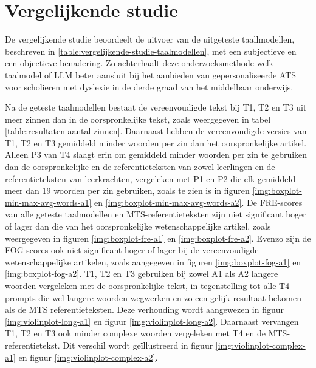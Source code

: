 \section{Vergelijkende studie}


De vergelijkende studie beoordeelt de uitvoer van de uitgeteste taallmodellen, beschreven in \ref{table:vergelijkende-studie-taalmodellen}, met een subjectieve en een objectieve benadering. Zo achterhaalt deze onderzoeksmethode welk taalmodel of LLM beter aansluit bij het aanbieden van gepersonaliseerde ATS voor scholieren met dyslexie in de derde graad van het middelbaar onderwijs. 

\medspace

Na de geteste taalmodellen bestaat de vereenvoudigde tekst bij T1, T2 en T3 uit meer zinnen dan in de oorspronkelijke tekst, zoals weergegeven in tabel \ref{table:resultaten-aantal-zinnen}. Daarnaast hebben de vereenvoudigde versies van T1, T2 en T3 gemiddeld minder woorden per zin dan het oorspronkelijke artikel. Alleen P3 van T4 slaagt erin om gemiddeld minder woorden per zin te gebruiken dan de oorspronkelijke en de referentieteksten van zowel leerlingen en de referentieteksten van leerkrachten, vergeleken met P1 en P2 die elk gemiddeld meer dan 19 woorden per zin gebruiken, zoals te zien is in figuren \ref{img:boxplot-min-max-avg-words-a1} en \ref{img:boxplot-min-max-avg-words-a2}. De FRE-scores van alle geteste taalmodellen en MTS-referentieteksten zijn niet significant hoger of lager dan die van het oorspronkelijke wetenschappelijke artikel, zoals weergegeven in figuren \ref{img:boxplot-fre-a1} en \ref{img:boxplot-fre-a2}. Evenzo zijn de FOG-scores ook niet significant hoger of lager bij de vereenvoudigde wetenschappelijke artikelen, zoals aangegeven in figuren \ref{img:boxplot-fog-a1} en \ref{img:boxplot-fog-a2}. T1, T2 en T3 gebruiken bij zowel A1 als A2 langere woorden vergeleken met de oorspronkelijke tekst, in tegenstelling tot alle T4 prompts die wel langere woorden wegwerken en zo een gelijk resultaat bekomen als de MTS referentieteksten. Deze verhouding wordt aangewezen in figuur \ref{img:violinplot-long-a1} en figuur \ref{img:violinplot-long-a2}. Daarnaast vervangen T1, T2 en T3 ook minder complexe woorden vergeleken met T4 en de MTS-referentietekst. Dit verschil wordt geïllustreerd in figuur \ref{img:violinplot-complex-a1} en figuur \ref{img:violinplot-complex-a2}.

\medspace

